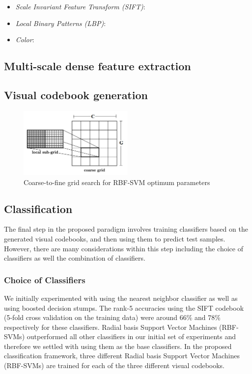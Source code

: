 \documentclass[12pt]{article}
\begin{document}
\begin{itemize}

\item \textit{Scale Invariant Feature Transform (SIFT)}:

\item \textit{Local Binary Patterns (LBP)}:

\item \textit{Color}:

\end{itemize}

\subsection{Multi-scale dense feature extraction}


\subsection{Visual codebook generation}


\begin{figure}
\centering
\includegraphics[width = 0.5\textwidth, height =0.2\textheight]{gridsearch}
\caption{Coarse-to-fine grid search for RBF-SVM optimum parameters}
\label{fig:gridsearch}
\end{figure}

\subsection{Classification}
The final step in the proposed paradigm involves training classifiers based on the generated visual codebooks, and then using them to predict test samples. However, there are many considerations within this step including the choice of classifiers as well the combination of classifiers.

\subsubsection{Choice of Classifiers}
We initially experimented with using the nearest neighbor classifier as well as using boosted decision stumps. The rank-5 accuracies using the SIFT codebook (5-fold cross validation on the training data) were around 66\% and 78\% respectively for these classifiers. Radial basis Support Vector Machines (RBF-SVMs) outperformed all other classifiers in our initial set of experiments and therefore we settled with using them as the base classifiers. In the proposed classification framework, three different Radial basis Support Vector Machines (RBF-SVMs) are trained for each of the three different visual codebooks.
\end{document}
